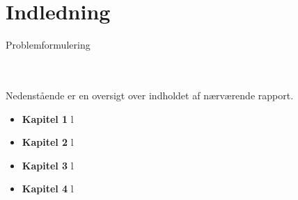 \chapter*{Indledning}
% 

%
\begin{col}{}{}
Problemformulering
\end{col}
% 
\noindent
%
\\\\
Nedenstående er en oversigt over indholdet af nærværende rapport.
%
\begin{itemize}[itemindent=0em]
\item[]\textbf{Kapitel 1} l
\item[]\textbf{Kapitel 2} l
\item[]\textbf{Kapitel 3} l
\item[]\textbf{Kapitel 4} l
\end{itemize}
%
